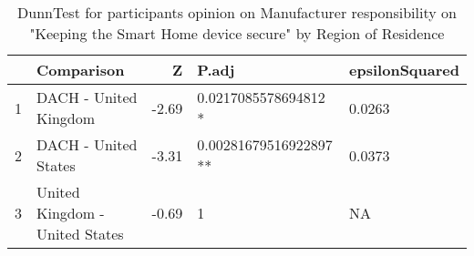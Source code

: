 \begin{table}[ht]
\centering
\begin{tabular}{rlrll}
  \hline
 & Comparison & Z & P.adj & epsilonSquared \\ 
  \hline
1 & DACH - United Kingdom & -2.69 & 0.0217085578694812 * & 0.0263 \\ 
  2 & DACH - United States & -3.31 & 0.00281679516922897 ** & 0.0373 \\ 
  3 & United Kingdom - United States & -0.69 & 1   & NA \\ 
   \hline
\end{tabular}
\caption{DunnTest for participants opinion on Manufacturer responsibility on "Keeping the Smart Home device secure" by Region of Residence} 
\label{RQ2_H3_ResponsibilityA204_04}
\end{table}
